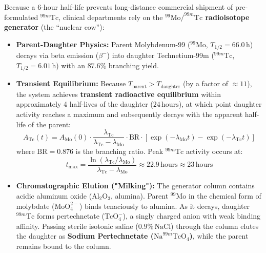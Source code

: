 \documentclass[11pt,a4paper]{article}
\begin{document}
Because a 6-hour half-life prevents long-distance commercial shipment of pre-formulated $^{99m}\text{Tc}$, clinical departments rely on the \textbf{$^{99}\text{Mo}/^{99m}\text{Tc}$ radioisotope generator} (the ``nuclear cow''):
\begin{itemize}[leftmargin=*]
    \item \textbf{Parent-Daughter Physics:} Parent Molybdenum-99 ($^{99}\text{Mo}$, $T_{1/2} = 66.0\,\text{h}$) decays via beta emission ($\beta^-$) into daughter Technetium-99m ($^{99m}\text{Tc}$, $T_{1/2} = 6.01\,\text{h}$) with an $87.6\%$ branching yield.
    \item \textbf{Transient Equilibrium:} Because $T_{\text{parent}} > T_{\text{daughter}}$ (by a factor of $\approx 11$), the system achieves \textbf{transient radioactive equilibrium} within approximately 4 half-lives of the daughter ($24\,\text{hours}$), at which point daughter activity reaches a maximum and subsequently decays with the apparent half-life of the parent:
    \begin{equation}
        A_{\text{Tc}}(t) = A_{\text{Mo}}(0) \cdot \frac{\lambda_{\text{Tc}}}{\lambda_{\text{Tc}} - \lambda_{\text{Mo}}} \cdot \text{BR} \cdot \left[ \exp(-\lambda_{\text{Mo}} t) - \exp(-\lambda_{\text{Tc}} t) \right]
    \end{equation}
    where $\text{BR} = 0.876$ is the branching ratio. Peak $^{99m}\text{Tc}$ activity occurs at:
    \begin{equation}
        t_{\text{max}} = \frac{\ln(\lambda_{\text{Tc}} / \lambda_{\text{Mo}})}{\lambda_{\text{Tc}} - \lambda_{\text{Mo}}} \approx 22.9\,\text{hours} \approx 23\,\text{hours}
    \end{equation}
    \item \textbf{Chromatographic Elution ("Milking"):} The generator column contains acidic aluminum oxide ($\text{Al}_2\text{O}_3$, alumina). Parent $^{99}\text{Mo}$ in the chemical form of molybdate ($\text{MoO}_4^{2-}$) binds tenaciously to alumina. As it decays, daughter $^{99m}\text{Tc}$ forms pertechnetate ($\text{TcO}_4^-$), a singly charged anion with weak binding affinity. Passing sterile isotonic saline ($0.9\%\,\text{NaCl}$) through the column elutes the daughter as \textbf{Sodium Pertechnetate ($\text{Na}^{99m}\text{TcO}_4$)}, while the parent remains bound to the column.
\end{itemize}
\end{document}
